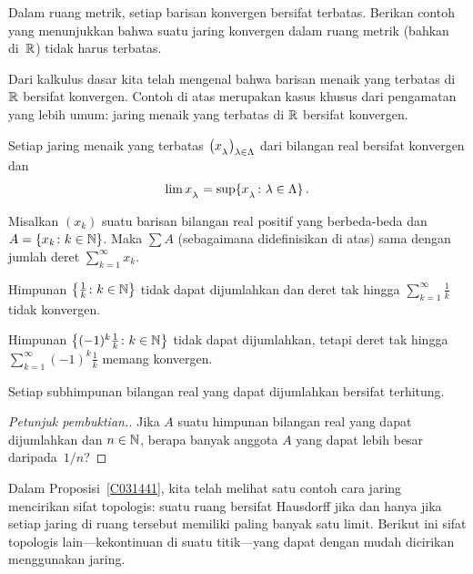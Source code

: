 \begin{exam} Dalam ruang metrik, setiap barisan konvergen bersifat terbatas. Berikan contoh yang menunjukkan
bahwa suatu jaring konvergen dalam ruang metrik (bahkan di~$\mathbb{R}$) tidak harus terbatas.
\end{exam}

Dari kalkulus dasar kita telah mengenal bahwa barisan menaik yang terbatas di $\mathbb{R}$
bersifat konvergen. Contoh di atas merupakan kasus khusus dari pengamatan yang lebih umum: jaring
menaik yang terbatas di $\mathbb{R}$ bersifat konvergen.

\begin{prop}\label{C031461} Setiap jaring menaik yang terbatas
$\bigl(x_{{}_{{\scriptstyle{\lambda}}}}\bigr)_{\lambda \in \Lambda}$ dari bilangan real bersifat konvergen dan
  \[ \lim x_{{}_{{\scriptstyle{\lambda}}}} = \sup\{x_{{}_{{\scriptstyle{\lambda}}}}\colon \lambda \in \Lambda\}\,. \]
\end{prop}

\begin{exam} Misalkan $(x_k)$ suatu barisan bilangan real positif yang berbeda-beda dan $A = \{x_k \colon k \in \mathbb{N}\}$.
Maka $\sum A$ (sebagaimana didefinisikan di atas) sama dengan jumlah deret $\sum_{k=1}^\infty
x_k$.
\end{exam}

\begin{exam} Himpunan $\bigl\{\frac1k \colon k \in \mathbb{N} \bigr\}$ tidak dapat dijumlahkan dan deret tak hingga
$\sum_{k=1}^\infty \frac1k$ tidak konvergen.
\end{exam}

\begin{exam} Himpunan $\bigl\{(-1)^k \frac1k\colon k \in \mathbb{N} \bigr\}$ tidak dapat dijumlahkan, tetapi
deret tak hingga $\sum_{k=1}^\infty (-1)^k \frac1k$ memang konvergen.
\end{exam}

\begin{prop} Setiap subhimpunan bilangan real yang dapat dijumlahkan bersifat terhitung.
\end{prop}

\begin{proof}[\emph{Petunjuk pembuktian.}] Jika $A$ suatu himpunan bilangan real yang dapat dijumlahkan dan $n \in \mathbb{N}$,
berapa banyak anggota $A$ yang dapat lebih besar daripada~$1/n$? \ns
\end{proof}

Dalam Proposisi~\ref{C031441}, kita telah melihat satu contoh cara jaring
mencirikan sifat topologis: suatu ruang bersifat Hausdorff jika dan hanya jika setiap jaring
di ruang tersebut memiliki paling banyak satu limit. Berikut ini sifat topologis lain---kekontinuan di suatu titik---yang dapat dengan mudah dicirikan menggunakan
jaring.


